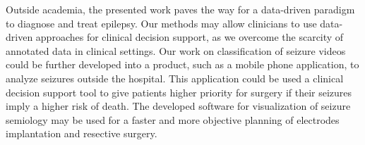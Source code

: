 Outside academia, the presented work paves the way for a data-driven paradigm to diagnose and treat epilepsy.
Our methods may allow clinicians to use data-driven approaches for clinical decision support, as we overcome the scarcity of annotated data in clinical settings.
Our work on classification of seizure videos could be further developed into a product, such as a mobile phone application, to analyze seizures outside the hospital.
This application could be used a clinical decision support tool to give patients higher priority for surgery if their seizures imply a higher risk of death.
The developed software for visualization of seizure semiology may be used for a faster and more objective planning of electrodes implantation and resective surgery.











